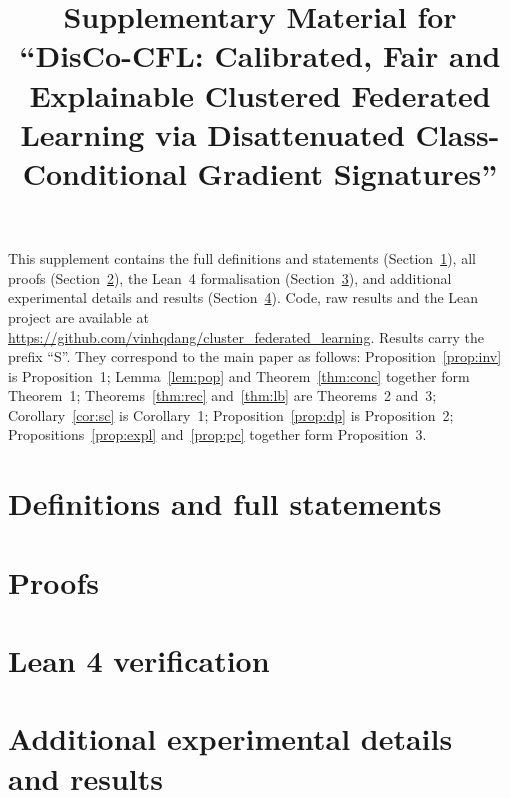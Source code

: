 \documentclass[11pt]{article}
\title{Supplementary Material for\\ ``DisCo-CFL: Calibrated, Fair and Explainable Clustered Federated Learning via Disattenuated Class-Conditional Gradient Signatures''}
\date{}
\newif\ifanon
\theoremstyle{definition}
\theoremstyle{remark}
\begin{document}
\maketitle

\noindent This supplement contains the full definitions and statements (Section~\ref{app:defs}), all proofs (Section~\ref{app:proofs}), the Lean~4 formalisation (Section~\ref{app:lean}), and additional experimental details and results (Section~\ref{app:results}). Code, raw results and the Lean project \ifanon will be made public upon acceptance\else are available at \url{https://github.com/vinhqdang/cluster_federated_learning}\fi. Results carry the prefix ``S''. They correspond to the main paper as follows: Proposition~\ref{prop:inv} is Proposition~1; Lemma~\ref{lem:pop} and Theorem~\ref{thm:conc} together form Theorem~1; Theorems~\ref{thm:rec} and~\ref{thm:lb} are Theorems~2 and~3; Corollary~\ref{cor:sc} is Corollary~1; Proposition~\ref{prop:dp} is Proposition~2; Propositions~\ref{prop:expl} and~\ref{prop:pc} together form Proposition~3.

\section{Definitions and full statements}\label{app:defs}



\section{Proofs}\label{app:proofs}


\section{Lean 4 verification}\label{app:lean}


\section{Additional experimental details and results}\label{app:results}




\end{document}
